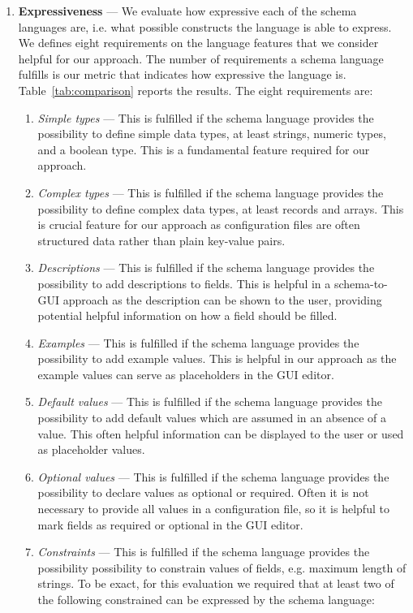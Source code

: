 \begin{enumerate}
    \item \textbf{Expressiveness} --- We evaluate how expressive each of the schema languages are, i.e. what possible constructs the language is able to express. We defines eight requirements on the language features that we consider helpful for our approach. The number of requirements a schema language fulfills is our metric that indicates how expressive the language is. Table~\ref{tab:comparison} reports the results. The eight requirements are:
    \begin{enumerate}
        \item \textit{Simple types} --- This is fulfilled if the schema language provides the possibility to define simple data types, at least strings, numeric types, and a boolean type. This is a fundamental feature required for our approach.
        \item \textit{Complex types} --- This is fulfilled if the schema language provides the possibility to define complex data types, at least records and arrays.
        This is crucial feature for our approach as configuration files are often structured data rather than plain key-value pairs.
        \item \textit{Descriptions} --- This is fulfilled if the schema language provides the possibility to add descriptions to fields. This is helpful in a schema-to-GUI approach as the description can be shown to the user, providing potential helpful information on how a field should be filled.
        \item \textit{Examples} --- This is fulfilled if the schema language provides the possibility to add example values. This is helpful in our approach as the example values can serve as placeholders in the GUI editor.
        \item \textit{Default values} --- This is fulfilled if the schema language provides the possibility to add default values which are assumed in an absence of a value. This often helpful information can be displayed to the user or used as placeholder values.
        \item \textit{Optional values} --- This is fulfilled if the schema language provides the possibility to declare values as optional or required. Often it is not necessary to provide all values in a configuration file, so it is helpful to mark fields as required or optional in the GUI editor.
        \item \textit{Constraints} --- This is fulfilled if the schema language provides the possibility possibility to constrain values of fields, e.g. maximum length of strings. To be exact, for this evaluation we required that at least two of the following constrained can be expressed by the schema language:

\end{enumerate}
\end{enumerate}
